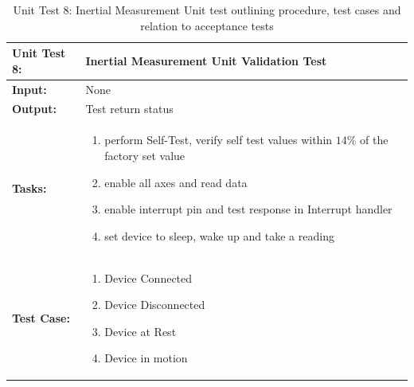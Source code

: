 \begin{table}[H]
    \centering
    \caption{Unit Test 8: Inertial Measurement Unit test outlining procedure, test cases and relation to acceptance tests}
    \begin{tabular}{|m{}|m{}|}
    \hline
       \textbf{Unit Test 8: }  &  Inertial Measurement Unit Validation Test\\
       \hline
        \textbf{Input: } &  None\\
        \hline
        \textbf{Output: } & Test return status \\
        \hline
        \textbf{Tasks: } & \begin{enumerate}
        \vspace{1mm}
            \item perform Self-Test, verify self test values within $14\%$ of the factory set value
            \item enable all axes and read data
            \item enable interrupt pin and test response in Interrupt handler
            \item set device to sleep, wake up and take a reading
        \end{enumerate}\\
        \hline
        \textbf{Test Case: } & \begin{enumerate}
            \vspace{1mm}
                \item Device Connected 
                \item Device Disconnected
                \item Device at Rest
                \item Device in motion
        \end{enumerate}\\
        \hline
    \end{tabular}
    \label{tab:UT008}
\end{table}

